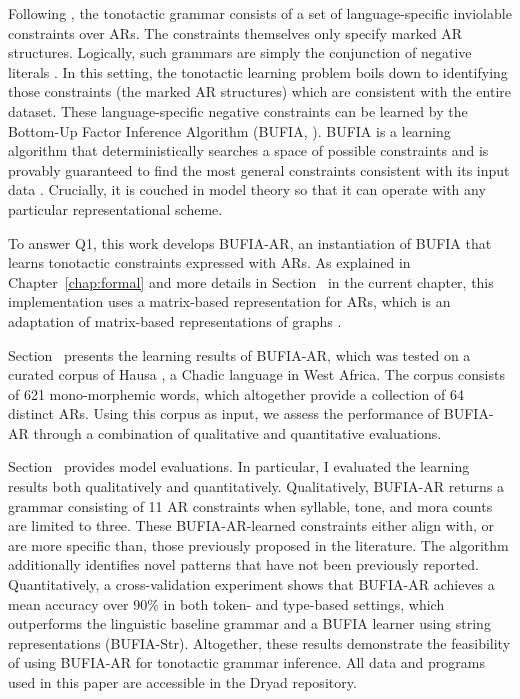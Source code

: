 Following \citet{jardine2017LocalNature}, the tonotactic grammar consists of a
set of language-specific inviolable constraints over ARs. The
constraints themselves only specify marked AR structures. Logically,
such grammars are simply the conjunction of negative literals
\citep{rogers.lambert2019mol}. In this setting, the tonotactic
learning problem boils down to identifying those constraints (the
marked AR structures) which are consistent with the entire dataset.
These language-specific negative constraints can be learned by 
the Bottom-Up Factor Inference Algorithm (BUFIA, \citet{chandleeBufia2019}).
BUFIA is a learning algorithm that deterministically searches a space of 
possible constraints and is provably guaranteed to find the most general
constraints consistent with its input data \citep{chandleeBufia2019,
	rawski2021structure}. Crucially, it is couched in model theory
\citep{Rogers1998, enderton2001mathematical} so that it can operate
with any particular representational scheme.

To answer Q1, this work develops BUFIA-AR, an instantiation of BUFIA 
that learns tonotactic constraints expressed with ARs. As explained in
Chapter~\ref{chap:formal} and more details in Section~ in
the current chapter, 
this implementation uses a matrix-based representation for ARs, which
is an adaptation of matrix-based representations of graphs
\citep{west2001introduction,CLRS2022}.

Section~ presents the learning results of BUFIA-AR, which
was tested on a curated corpus of Hausa \citep{wold-4,li2025learning}, a
Chadic language in West Africa. The corpus consists of 621
mono-morphemic words, which altogether provide a collection of 64
distinct ARs.  Using this corpus as input, we assess the performance
of BUFIA-AR through a combination of qualitative and quantitative
evaluations. 

Section~ provides model evaluations. In particular, I evaluated
the learning results both qualitatively and quantitatively. 
Qualitatively, BUFIA-AR returns a grammar consisting of 11 AR constraints 
when syllable, tone, and mora counts
are limited to three. These BUFIA-AR-learned constraints either align
with, or are more specific than, those previously proposed in the
literature. The algorithm additionally identifies novel patterns that
have not been previously reported. Quantitatively, a cross-validation
experiment shows that BUFIA-AR achieves a mean accuracy over 90\% in
both token- and type-based settings, which outperforms the linguistic 
baseline grammar and a BUFIA learner using
string representations (BUFIA-Str). Altogether, these results
demonstrate the feasibility of using BUFIA-AR for tonotactic grammar
inference. All data and programs used in this paper are accessible in
the Dryad repository.

